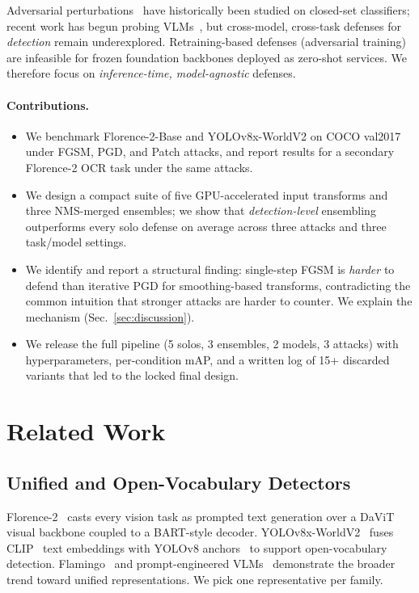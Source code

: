 \documentclass[10pt,twocolumn,letterpaper]{article}
\begin{document}
Adversarial perturbations~\cite{goodfellow2014explaining,madry2017towards} have historically been studied on closed-set classifiers; recent work has begun probing VLMs~\cite{wang2024oneobjectmultiplelies}, but cross-model, cross-task defenses for \emph{detection} remain underexplored. Retraining-based defenses (adversarial training) are infeasible for frozen foundation backbones deployed as zero-shot services. We therefore focus on \emph{inference-time, model-agnostic} defenses.

\paragraph{Contributions.}
\begin{itemize}
\itemsep -0.25em
\item We benchmark Florence-2-Base and YOLOv8x-WorldV2 on COCO val2017 under FGSM, PGD, and Patch attacks, and report results for a secondary Florence-2 OCR task under the same attacks.
\item We design a compact suite of five GPU-accelerated input transforms and three NMS-merged ensembles; we show that \emph{detection-level} ensembling outperforms every solo defense on average across three attacks and three task/model settings.
\item We identify and report a structural finding: single-step FGSM is \emph{harder} to defend than iterative PGD for smoothing-based transforms, contradicting the common intuition that stronger attacks are harder to counter. We explain the mechanism (Sec.~\ref{sec:discussion}).
\item We release the full pipeline (5 solos, 3 ensembles, 2 models, 3 attacks) with hyperparameters, per-condition mAP, and a written log of 15+ discarded variants that led to the locked final design.
\end{itemize}

\section{Related Work}

\subsection{Unified and Open-Vocabulary Detectors}
Florence-2~\cite{xiao2024florence2,xiao2023florence2} casts every vision task as prompted text generation over a DaViT~\cite{ding2022davit} visual backbone coupled to a BART-style decoder. YOLOv8x-WorldV2~\cite{cheng2024yoloworld} fuses CLIP~\cite{radford2021learning} text embeddings with YOLOv8 anchors~\cite{redmon2016yolo} to support open-vocabulary detection. Flamingo~\cite{alayrac2022flamingo} and prompt-engineered VLMs~\cite{zhou2022prompt} demonstrate the broader trend toward unified representations. We pick one representative per family.
\end{document}
